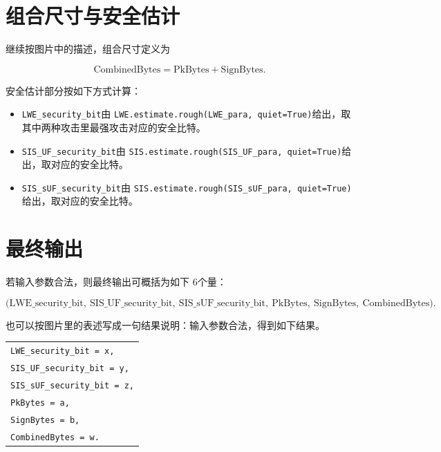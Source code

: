 \documentclass[11pt]{article}
\newcommand{\zh}[1]{{\zhfont #1}}
\begin{document}
\section*{\zh{组合尺寸与安全估计}}
{\zhfont 继续按图片中的描述，组合尺寸定义为}

\[
\mathrm{CombinedBytes} = \mathrm{PkBytes} + \mathrm{SignBytes}.
\]

{\zhfont 安全估计部分按如下方式计算：}

\begin{itemize}
  \item {\zhfont }\texttt{LWE\_security\_bit}{\zhfont 由 }\texttt{LWE.estimate.rough(LWE\_para, quiet=True)}{\zhfont 给出，取其中两种攻击里最强攻击对应的安全比特。}
  \item {\zhfont }\texttt{SIS\_UF\_security\_bit}{\zhfont 由 }\texttt{SIS.estimate.rough(SIS\_UF\_para, quiet=True)}{\zhfont 给出，取对应的安全比特。}
  \item {\zhfont }\texttt{SIS\_sUF\_security\_bit}{\zhfont 由 }\texttt{SIS.estimate.rough(SIS\_sUF\_para, quiet=True)}{\zhfont 给出，取对应的安全比特。}
\end{itemize}

\section*{\zh{最终输出}}
{\zhfont 若输入参数合法，则最终输出可概括为如下 }$6${\zhfont 个量：}

\[
\bigl(\mathrm{LWE\_security\_bit},\ \mathrm{SIS\_UF\_security\_bit},\ \mathrm{SIS\_sUF\_security\_bit},\ \mathrm{PkBytes},\ \mathrm{SignBytes},\ \mathrm{CombinedBytes}\bigr).
\]

{\zhfont 也可以按图片里的表述写成一句结果说明：输入参数合法，得到如下结果。}

{\small
\begin{tabular}{@{}l@{}}
\texttt{LWE\_security\_bit = x,}\\
\texttt{SIS\_UF\_security\_bit = y,}\\
\texttt{SIS\_sUF\_security\_bit = z,}\\
\texttt{PkBytes = a,}\\
\texttt{SignBytes = b,}\\
\texttt{CombinedBytes = w.}
\end{tabular}
}
\end{document}
